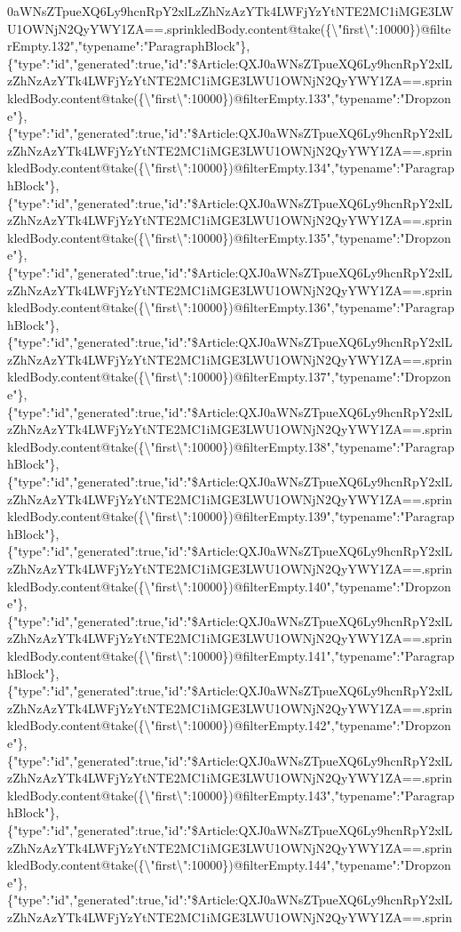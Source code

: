 0aWNsZTpueXQ6Ly9hcnRpY2xlLzZhNzAzYTk4LWFjYzYtNTE2MC1iMGE3LWU1OWNjN2QyYWY1ZA==.sprinkledBody.content@take(\{\textbackslash{}"first\textbackslash{}":10000\})@filterEmpty.132","typename":"ParagraphBlock"\},\{"type":"id","generated":true,"id":"\$Article:QXJ0aWNsZTpueXQ6Ly9hcnRpY2xlLzZhNzAzYTk4LWFjYzYtNTE2MC1iMGE3LWU1OWNjN2QyYWY1ZA==.sprinkledBody.content@take(\{\textbackslash{}"first\textbackslash{}":10000\})@filterEmpty.133","typename":"Dropzone"\},\{"type":"id","generated":true,"id":"\$Article:QXJ0aWNsZTpueXQ6Ly9hcnRpY2xlLzZhNzAzYTk4LWFjYzYtNTE2MC1iMGE3LWU1OWNjN2QyYWY1ZA==.sprinkledBody.content@take(\{\textbackslash{}"first\textbackslash{}":10000\})@filterEmpty.134","typename":"ParagraphBlock"\},\{"type":"id","generated":true,"id":"\$Article:QXJ0aWNsZTpueXQ6Ly9hcnRpY2xlLzZhNzAzYTk4LWFjYzYtNTE2MC1iMGE3LWU1OWNjN2QyYWY1ZA==.sprinkledBody.content@take(\{\textbackslash{}"first\textbackslash{}":10000\})@filterEmpty.135","typename":"Dropzone"\},\{"type":"id","generated":true,"id":"\$Article:QXJ0aWNsZTpueXQ6Ly9hcnRpY2xlLzZhNzAzYTk4LWFjYzYtNTE2MC1iMGE3LWU1OWNjN2QyYWY1ZA==.sprinkledBody.content@take(\{\textbackslash{}"first\textbackslash{}":10000\})@filterEmpty.136","typename":"ParagraphBlock"\},\{"type":"id","generated":true,"id":"\$Article:QXJ0aWNsZTpueXQ6Ly9hcnRpY2xlLzZhNzAzYTk4LWFjYzYtNTE2MC1iMGE3LWU1OWNjN2QyYWY1ZA==.sprinkledBody.content@take(\{\textbackslash{}"first\textbackslash{}":10000\})@filterEmpty.137","typename":"Dropzone"\},\{"type":"id","generated":true,"id":"\$Article:QXJ0aWNsZTpueXQ6Ly9hcnRpY2xlLzZhNzAzYTk4LWFjYzYtNTE2MC1iMGE3LWU1OWNjN2QyYWY1ZA==.sprinkledBody.content@take(\{\textbackslash{}"first\textbackslash{}":10000\})@filterEmpty.138","typename":"ParagraphBlock"\},\{"type":"id","generated":true,"id":"\$Article:QXJ0aWNsZTpueXQ6Ly9hcnRpY2xlLzZhNzAzYTk4LWFjYzYtNTE2MC1iMGE3LWU1OWNjN2QyYWY1ZA==.sprinkledBody.content@take(\{\textbackslash{}"first\textbackslash{}":10000\})@filterEmpty.139","typename":"ParagraphBlock"\},\{"type":"id","generated":true,"id":"\$Article:QXJ0aWNsZTpueXQ6Ly9hcnRpY2xlLzZhNzAzYTk4LWFjYzYtNTE2MC1iMGE3LWU1OWNjN2QyYWY1ZA==.sprinkledBody.content@take(\{\textbackslash{}"first\textbackslash{}":10000\})@filterEmpty.140","typename":"Dropzone"\},\{"type":"id","generated":true,"id":"\$Article:QXJ0aWNsZTpueXQ6Ly9hcnRpY2xlLzZhNzAzYTk4LWFjYzYtNTE2MC1iMGE3LWU1OWNjN2QyYWY1ZA==.sprinkledBody.content@take(\{\textbackslash{}"first\textbackslash{}":10000\})@filterEmpty.141","typename":"ParagraphBlock"\},\{"type":"id","generated":true,"id":"\$Article:QXJ0aWNsZTpueXQ6Ly9hcnRpY2xlLzZhNzAzYTk4LWFjYzYtNTE2MC1iMGE3LWU1OWNjN2QyYWY1ZA==.sprinkledBody.content@take(\{\textbackslash{}"first\textbackslash{}":10000\})@filterEmpty.142","typename":"Dropzone"\},\{"type":"id","generated":true,"id":"\$Article:QXJ0aWNsZTpueXQ6Ly9hcnRpY2xlLzZhNzAzYTk4LWFjYzYtNTE2MC1iMGE3LWU1OWNjN2QyYWY1ZA==.sprinkledBody.content@take(\{\textbackslash{}"first\textbackslash{}":10000\})@filterEmpty.143","typename":"ParagraphBlock"\},\{"type":"id","generated":true,"id":"\$Article:QXJ0aWNsZTpueXQ6Ly9hcnRpY2xlLzZhNzAzYTk4LWFjYzYtNTE2MC1iMGE3LWU1OWNjN2QyYWY1ZA==.sprinkledBody.content@take(\{\textbackslash{}"first\textbackslash{}":10000\})@filterEmpty.144","typename":"Dropzone"\},\{"type":"id","generated":true,"id":"\$Article:QXJ0aWNsZTpueXQ6Ly9hcnRpY2xlLzZhNzAzYTk4LWFjYzYtNTE2MC1iMGE3LWU1OWNjN2QyYWY1ZA==.sprin